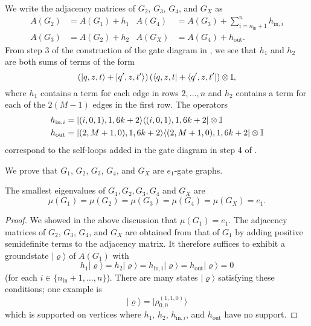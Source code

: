\documentclass[../thesis-main/thesis-main]{subfiles}
\begin{document}
We write the adjacency matrices of $G_{2}$, $G_{3}$, $G_{4}$, and $G_X$ as 
\begin{align}
  A(G_{2}) &= A(G_{1})+h_{1} & 
  A(G_{4}) &= A(G_{3})+\sum_{i=n_{\text{in}}+1}^{n}h_{\text{in},i} \\
  A(G_{3}) &= A(G_{2})+h_{2} &
  A(G_X)   &= A(G_{4})+h_{\text{out}}.
\end{align}
From step 3 of the construction of the gate diagram in , we see that $h_{1}$ and $h_{2}$ are both sums of terms of the form 
\begin{equation}
  \left(|q,z,t\rangle+|q^{\prime},z,t^{\prime}\rangle\right)
  \left(\langle q,z,t|+\langle q^{\prime},z,t^{\prime}|\right)\otimes\mathbb{I},
\end{equation}
where $h_1$ contains a term for each edge in rows $2,\ldots, n$ and $h_2$ contains a term for each of the $2(M-1)$ edges in the first row. The operators
\begin{align}
  h_{\mathrm{in},i} &= |(i,0,1),1,6k+2\rangle\langle(i,0,1),1,6k+2|\otimes\mathbb{I} \\
  h_{\text{out}} &= |(2,M+1,0),1,6k+2\rangle\langle(2,M+1,0),1,6k+2|\otimes\mathbb{I}
\label{eq:hin_i}
\end{align}
correspond to the self-loops added in the gate diagram in step 4 of . 

We prove that $G_1$, $G_2$, $G_3$, $G_4$, and $G_X$ are $e_1$-gate graphs.

\begin{lemma}
\label{lem:The-smallest-eigenvalues}The smallest eigenvalues of $G_{1},G_{2},G_{3},G_{4}$
and $G_X$ are 
\begin{equation}
\mu(G_{1})=\mu(G_{2})=\mu(G_{3})=\mu(G_{4})=\mu(G_X)=e_{1}.
\end{equation}
\end{lemma}

\begin{proof}
We showed in the above discussion that $\mu(G_{1})=e_{1}$. The adjacency matrices of $G_{2}$, $G_{3}$, $G_{4}$, and $G_X$ are obtained from that of $G_{1}$ by adding positive semidefinite terms to the adjacency matrix. It therefore suffices to exhibit a groundstate $|\varrho\rangle$ of $A(G_{1})$ with
\begin{equation}
  h_{1}|\varrho\rangle
  =h_{2}|\varrho\rangle
  =h_{\text{in},i}|\varrho\rangle
  =h_{\text{out}}|\varrho\rangle
  =0
\end{equation}
(for each $i\in\{n_{\text{in}}+1,\ldots,n\}$). There are many states $|\varrho\rangle$ satisfying these conditions; one example is
\begin{equation}
|\varrho\rangle = |\rho_{0,0}^{(1,1,0)}\rangle
\end{equation}
which is supported on vertices where $h_{1}$, $h_{2}$, $h_{\text{in},i}$, and $h_{\text{out}}$ have no support.
\end{proof}
\end{document}
